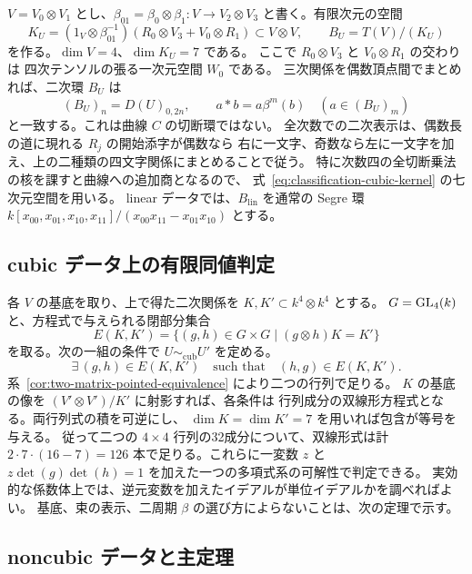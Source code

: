 $V=V_0\otimes V_1$ とし、$\beta_{01}=\beta_0\otimes\beta_1:
V\to V_2\otimes V_3$ と書く。有限次元の空間
\begin{equation}
 K_U=(1_V\otimes\beta_{01}^{-1})
       (R_0\otimes V_3+V_0\otimes R_1)\subset V\otimes V,
 \qquad B_U=T(V)/(K_U)
 \label{eq:classification-cubic-kernel}
\end{equation}
を作る。$\dim V=4$、$\dim K_U=7$ である。
ここで $R_0\otimes V_3$ と $V_0\otimes R_1$ の交わりは
四次テンソルの張る一次元空間 $W_0$ である。
三次関係を偶数頂点間でまとめれば、二次環 $B_U$ は
\[
 (B_U)_n=D(U)_{0,2n},\qquad a*b=a\beta^m(b)
 \quad(a\in(B_U)_m)
\]
と一致する。これは曲線 $C$ の切断環ではない。
全次数での二次表示は、偶数長の道に現れる $R_j$ の開始添字が偶数なら
右に一文字、奇数なら左に一文字を加え、上の二種類の四文字関係にまとめることで従う。
特に次数四の全切断乗法の核を課すと曲線への追加商となるので、
式~\eqref{eq:classification-cubic-kernel} の七次元空間を用いる。
linear データでは、$B_{\mathrm{lin}}$ を通常の Segre 環
$k[x_{00},x_{01},x_{10},x_{11}]/(x_{00}x_{11}-x_{01}x_{10})$ とする。

\subsection{cubic データ上の有限同値判定}

各 $V$ の基底を取り、上で得た二次関係を
$K,K'\subset k^4\otimes k^4$ とする。
$G=\operatorname{GL}_4(k)$ と、方程式で与えられる閉部分集合
\[
 E(K,K')=\{(g,h)\in G\times G\mid(g\otimes h)K=K'\}
\]
を取る。次の一組の条件で $U\sim_{\mathrm{cub}}U'$ を定める。
\begin{equation}\label{eq:classification-finite-relation}
 \exists\,(g,h)\in E(K,K')\quad\text{such that}\quad(h,g)\in E(K,K').
\end{equation}
系~\ref{cor:two-matrix-pointed-equivalence} により二つの行列で足りる。
$K$ の基底の像を $(V'\otimes V')/K'$ に射影すれば、各条件は
行列成分の双線形方程式となる。両行列式の積を可逆にし、
$\dim K=\dim K'=7$ を用いれば包含が等号を与える。
従って二つの $4\times4$ 行列の32成分について、双線形式は計
$2\cdot7\cdot(16-7)=126$ 本で足りる。これらに一変数 $z$ と
$z\det(g)\det(h)=1$ を加えた一つの多項式系の可解性で判定できる。
実効的な係数体上では、逆元変数を加えたイデアルが単位イデアルかを調べればよい。
基底、束の表示、二周期 $\beta$ の選び方によらないことは、次の定理で示す。

\subsection{noncubic データと主定理}


